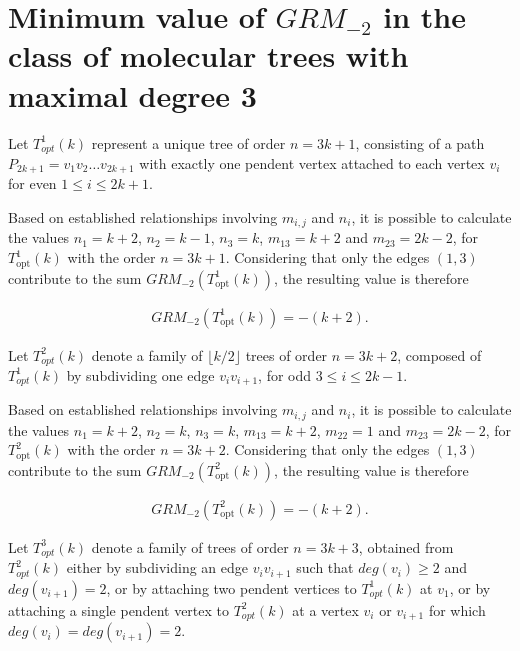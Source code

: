 \documentclass[preprint,12pt]{elsarticle}
\begin{document}


\section{Minimum value of $GRM_{-2}$ in the class of molecular trees with  maximal degree 3}


Let $T^1_{opt}(k)$ represent a unique tree of order $n = 3k + 1$, consisting of a path $P_{2k+1} = v_1 v_2 \ldots v_{2k+1}$ with exactly one pendent vertex attached to each vertex $v_i$ for even $1 \leq i \leq 2k+1$.

Based on established relationships involving $m_{i,j}$ and $n_i$, it is possible to calculate the values
$n_1=k+2$, $n_2=k-1$, $n_{3}=k$, $m_{13}=k+2$ and $m_{23}=2k-2$, for $T_{\text{opt}}^1(k)$ with the order $n=3k+1$.
Considering that only the edges $(1,3)$ contribute to the sum $GRM_{-2}(T_{\text{opt}}^1(k))$, the resulting value is therefore

\begin{eqnarray}
\label{Zagreb_opt}
GRM_{-2}(T_{\text{opt}}^1(k))=-(k+2).
\end{eqnarray}


Let $T^2_{opt} (k)$ denote a family of $\lfloor k / 2 \rfloor$ trees of order $n = 3k+2$, composed of $T^{1}_{opt} (k)$ by subdividing one edge $v_iv_{i+1}$, for odd $3\leq i \leq 2k-1$.


Based on established relationships involving $m_{i,j}$ and $n_i$, it is possible to calculate the values
$n_1=k+2$, $n_2=k$, $n_{3}=k$, $m_{13}=k+2$, $m_{22}=1$ and $m_{23}=2k-2$, for $T_{\text{opt}}^2(k)$ with the order $n=3k+2$.
Considering that only the edges $(1,3)$ contribute to the sum $GRM_{-2}(T_{\text{opt}}^2(k))$, the resulting value is therefore


\begin{eqnarray}
\label{Zagreb_opt_2}
GRM_{-2}(T_{\text{opt}}^2(k))=-(k+2).
\end{eqnarray}


Let $T^3_{opt}(k)$ denote a family of trees of order $n = 3k + 3$, obtained from $T^2_{opt}(k)$ either by subdividing an edge $v_i v_{i+1}$ such that $deg(v_i) \geq 2$ and $deg(v_{i+1}) = 2$, or by attaching two pendent vertices to $T^1_{opt}(k)$ at $v_1$, or by attaching a single pendent vertex to $T^2_{opt}(k)$ at a vertex  $v_i$ or $v_{i+1}$ for which $deg(v_i) = deg(v_{i+1}) = 2$. 
\end{document}
